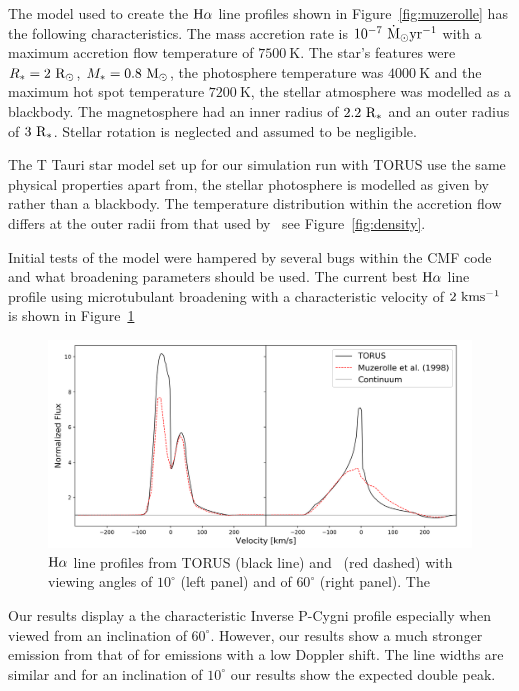 \documentclass[fleqn,usenatbib]{mnras}
\begin{document}
The model used to create the ${\rm H}\alpha$ line profiles shown in Figure~\ref{fig:muzerolle} has the following characteristics. The mass accretion rate is $10^{-7} ~{\rm \dot{M}_{\odot}yr^{-1}}$ with a maximum accretion flow temperature of $7500~\textrm{K}$. The star's features were $R_{\ast}=2~{\rm R_{\odot}}$, $M_{\ast}=0.8~{\rm M_{\odot}}$, the photosphere temperature was $4000~\textrm{K}$ and the maximum hot spot temperature $7200~\textrm{K}$, the stellar atmosphere was modelled as a blackbody. The magnetosphere had an inner radius of $2.2~{\rm R_{\ast}}$ and an outer radius of $3~{\rm R_{\ast}}$. Stellar rotation is neglected and assumed to be negligible.

The T Tauri star model set up for our simulation run with TORUS use the same physical properties apart from, the stellar photosphere is modelled as given by~\citet{1979ApJS...40....1K} rather than a blackbody. The temperature distribution within the accretion flow differs at the outer radii from that used by~\citet{1998ApJ...492..743M} see Figure~\ref{fig:density}.

Initial tests of the model were hampered by several bugs within the CMF code and what broadening parameters should be used. The current best ${\rm H}\alpha$ line profile using microtubulant broadening with a characteristic velocity of $2~{\rm kms^{-1}}$ is shown in Figure~\ref{fig:bestline}

\begin{figure}
    \centering
    \includegraphics[width=\linewidth]{figures/results}
    \caption{${\rm H}\alpha$ line profiles from TORUS (black line) and~\citep{1998ApJ...492..743M} (red dashed) with viewing angles of $10^{\circ}$ (left panel) and of $60^{\circ}$ (right panel). The}
    \label{fig:bestline}
\end{figure}

Our results display a the characteristic Inverse P-Cygni profile especially when viewed from an inclination of $60^{\circ}$. However, our results show a much stronger emission from that of\citep{1998ApJ...492..743M} for emissions with a low Doppler shift. The line widths are similar and for an inclination of $10^{\circ}$ our results show the expected double peak.
\end{document}
